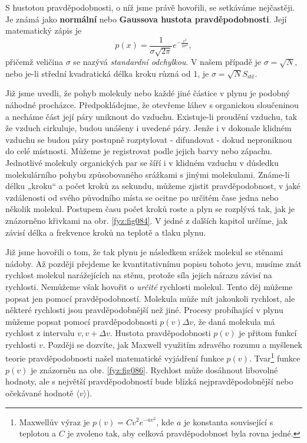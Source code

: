     S hustotou pravděpodobnosti, o níž jsme právě hovořili, se setkáváme nejčastěji. Je známá jako 
    \textbf{normální} nebo \textbf{Gaussova hustota pravděpodobnosti}. Její matematický zápis je
    \begin{equation}\label{fyz:eq091}
      p(x) = \frac{1}{\sigma\sqrt{2\pi}}e^{-\frac{x^2}{2\sigma^2}},	
    \end{equation}    
    přičemž veličina \(\sigma\) se nazývá \emph{standardní odchylkou}. V našem případě je \(\sigma 
    = \sqrt{N}\), nebo je-li střední kvadratická délka kroku různá od \num{1}, je 
    \(\sigma=\sqrt{N}S_\text{stř}\).
    
    Již jsme uvedli, že pohyb molekuly nebo každé jiné částice v plynu je podobný náhodné 
    procházce. Předpokládejme, že otevřeme láhev s organickou sloučeninou a necháme část její páry 
    uniknout do vzduchu. Existuje-li proudění vzduchu, tak že vzduch cirkuluje, budou unášeny i 
    uvedené páry. Jenže i v dokonale klidném vzduchu se budou páry postupně rozptylovat - 
    difundovat - dokud neproniknou do celé místnosti. Můžeme je registrovat podle jejich barvy nebo 
    zápachu. Jednotlivé molekuly organických par se šíří i v klidném vzduchu v důsledku 
    molekulárního pohybu způsobovaného srážkami s jinými molekulami. Známe-li délku „kroku“ a počet 
    kroků za sekundu, můžeme zjistit pravděpodobnost, v jaké vzdálenosti od svého původního místa 
    se ocitne po určitém čase jedna nebo několik molekul. Postupem času počet kroků roste a plyn se 
    rozplývá tak, jak je znázorněno křivkami na obr. \ref{fyz:fig084}. V jedné z dalších kapitol 
    určíme, jak závisí délka a frekvence kroků na teplotě a tlaku plynu.
    
    Již jsme hovořili o tom, že tak plynu je následkem srážek molekul se stěnami nádoby. Až později 
    přejdeme ke kvantitativnímu popisu tohoto jevu, musíme znát rychlost molekul narážejících na 
    stěnu, protože síla jejich nárazu závisí na rychlosti. Nemůžeme však hovořit o \emph{určité} 
    rychlosti molekul. Tento děj můžeme popsat jen pomocí pravděpodobností. Molekula může mít 
    jakoukoli rychlost, ale některé rychlosti jsou pravděpodobnější než jiné. Procesy probíhající v 
    plynu můžeme popsat pomocí pravděpodobnosti \(p(v)\Delta v\), že daná molekula má rychlost z 
    intervalu \(v, v+ \Delta v\). Hustota pravděpodobnosti \(p(v)\) je přitom funkcí rychlosti 
    \(v\). Později se dozvíte, jak Maxwell využitím zdravého rozumu a myšlenek teorie 
    pravděpodobnosti našel matematické vyjádření funkce \(p(v)\). Tvar\footnote{Maxwellův výraz je 
    \(p(v) = Cv^2e^{-av^2}\), kde \(a\) je konstanta související s teplotou a \(C\) je zvoleno tak, 
    aby celková pravděpodobnost byla rovna jedné.} funkce \(p(v)\) je znázorněn na obr. 
    \ref{fyz:fig086}. Rychlost může dosáhnout libovolné hodnoty, ale s největší pravděpodobností 
    bude blízká nejpravděpodobnější nebo očekávané hodnotě \(\langle v\rangle\)).
    
